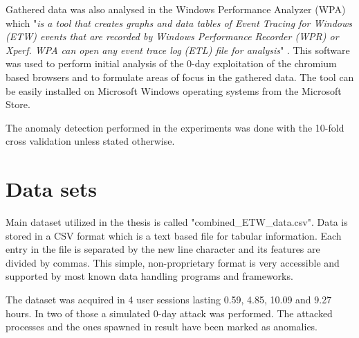 \documentclass[a4paper,twoside,12pt]{book}
\begin{document}
Gathered data was also analysed in the Windows Performance Analyzer (WPA) which "\textit{is a tool that 
creates graphs and data tables of Event Tracing for Windows (ETW) events that are recorded 
by Windows Performance Recorder (WPR) or Xperf. WPA can open any event trace log (ETL) file 
for analysis}" \cite{bib:wpa}. This software was used to perform initial analysis of the 0-day 
exploitation of the chromium based browsers and to formulate areas of focus in the gathered data. 
The tool can be easily installed on Microsoft Windows operating systems from the Microsoft Store.

The anomaly detection performed in the experiments was done with the 10-fold cross validation 
unless stated otherwise.

\section{Data sets}

Main dataset utilized in the thesis is called "combined\_ETW\_data.csv".
Data is stored in a CSV format which is a text based file for tabular information.  
Each entry in the file is separated by the new line character and its features are divided 
by commas. This simple, non-proprietary format is very accessible and supported by most 
known data handling programs and frameworks. 

The dataset was acquired in 4 user sessions lasting 0.59, 4.85, 10.09 and 9.27 hours. In two of those 
a simulated 0-day attack was performed. The attacked processes and the ones spawned in result have been marked as anomalies. 
\end{document}
